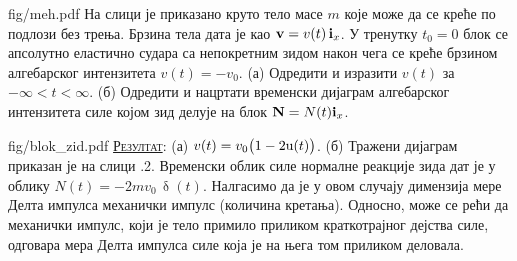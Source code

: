 
\begin{slikaDesno}[.833]{fig/meh.pdf}
\PID 
На слици је приказано круто тело масе $m$ 
које може да се креће по подлози без трења. 
Брзина тела дата је као ${\bf v} = v(t) \, 
{\bf i}_x$. У тренутку $t_0 = 0$ блок се 
апсолутно еластично судара са 
непокретним зидом након чега 
се креће брзином алгебарског интензитета 
$v(t) = -v_0$. (а) Одредити и 
изразити $v(t)$ за $-\infty< t < \infty$. 
(б) Одредити и нацртати временски дијаграм
алгебарског интензитета  
силе којом зид делује на блок ${\bf N} = N(t) 
{\bf i}_x$.
\end{slikaDesno}
\vspace*{5mm}

\begin{slikaDesno}[1]{fig/blok_zid.pdf}
\hspace*{5mm}
\textsc{\underline{Резултат}}:
(а) $v(t) = v_0 \bigl(1 - 2{\rm u}(t)\bigr)$.
(б) Тражени дијаграм приказан је на слици \ID.2.
Временски облик силе нормалне реакције зида дат је у облику 
$N(t) = -2mv_0 \, \updelta(t)$. Налгасимо да је у овом случају димензија
мере Делта импулса механички импулс (количина кретања). Односно, може се рећи да механички импулс, 
који је тело примило приликом краткотрајног дејства силе, одговара мера Делта импулса силе која је на 
њега том приликом деловала.
\end{slikaDesno}